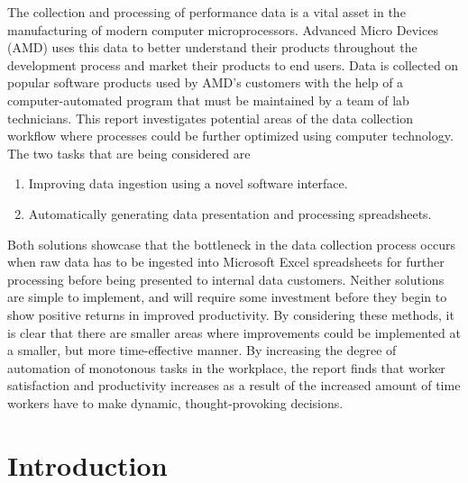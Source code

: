 \documentclass[12pt]{article}
\begin{document}



\indent\hspace{0.5in} The collection and processing of performance data is a vital asset in the manufacturing of modern computer microprocessors. Advanced Micro Devices (AMD) uses this data to better understand their products throughout the development process and market their products to end users. Data is collected on popular software products used by AMD's customers with the help of a computer-automated program that must be maintained by a team of lab technicians. This report investigates potential areas of the data collection workflow where processes could be further optimized using computer technology. The two tasks that are being considered are

\begin{enumerate}
\item Improving data ingestion using a novel software interface.
\item Automatically generating data presentation and processing spreadsheets.
\end{enumerate}

\indent\hspace{0.5in} Both solutions showcase that the bottleneck in the data collection process occurs when raw data has to be ingested into Microsoft Excel spreadsheets for further processing before being presented to internal data customers. Neither solutions are simple to implement, and will require some investment before they begin to show positive returns in improved productivity. By considering these methods, it is clear that there are smaller areas where improvements could be implemented at a smaller, but more time-effective manner. By increasing the degree of automation of monotonous tasks in the workplace, the report finds that worker satisfaction and productivity increases as a result of the increased amount of time workers have to make dynamic, thought-provoking decisions.


\formattingForRestOfReport
\section{Introduction}
\end{document}
